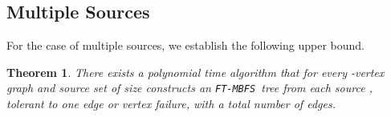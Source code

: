 \documentclass[12pt]{article}
\newtheorem{theorem}{Theorem}[section]
\def\FTMBFS{\mbox{\tt FT-MBFS}}
\def\FTBFS{\mbox{\tt FT-BFS}}
\begin{document}
\subsection{Multiple Sources}
\label{subsec:multisource}
For the case of multiple sources, we establish the following upper bound.
\begin{theorem}
\label{thm:multi_source_edgeonef}
There exists a polynomial time algorithm that for every -vertex graph
 and source set  of size  constructs
an \FTMBFS\ tree  from each source ,
tolerant to one edge or vertex failure,
with a total number of
 edges.
\end{theorem}
\def\APPENDUPPERMULTI{

\paragraph{The algorithm}
As in the single source case, to avoid complications due to shortest-paths
of the same length, all shortest path distances in  are computed using
a weight function  defined so as to ensure the uniqueness of a single 
shortest-path.
For every  and every , let  be the BFS tree rooted at  in .
Let 
be the joint structure containing all the BFS trees of .
Then by the previous section, the \FTBFS\ tree for  is . Define the \FTMBFS\ for  as


\paragraph{Analysis}
The correctness follows immediately by the single source case.
It remains to bound the number of edges of .
An edge  is \emph{new} if .
For every , define its new edge set in the graph  by

}
\end{document}
